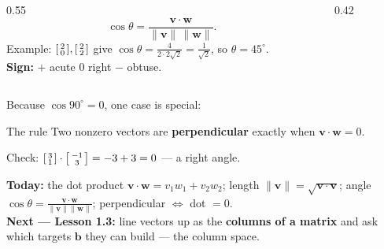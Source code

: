 \documentclass[aspectratio=169, 11pt]{beamer}
\newcommand{\vv}{\mathbf{v}}
\newcommand{\ww}{\mathbf{w}}
\begin{document}
\begin{frame}[t, plain]
  \begin{columns}[T]
    \begin{column}{0.55\textwidth}
      \[
        \cos\theta = \frac{\vv\cdot\ww}{\|\vv\|\,\|\ww\|}.
      \]
      Example: $\begin{bsmallmatrix} 2\\0 \end{bsmallmatrix},\begin{bsmallmatrix} 2\\2 \end{bsmallmatrix}$ give
      $\cos\theta=\tfrac{4}{2\cdot2\sqrt2}=\tfrac{1}{\sqrt2}$, so $\theta=45^\circ$.\\[6pt]
      \textbf{Sign:} $+$ acute \quad $0$ right \quad $-$ obtuse.
    \end{column}
    \begin{column}{0.42\textwidth}
      \centering
    \end{column}
  \end{columns}
\end{frame}

\begin{frame}[t, plain]
  Because $\cos 90^\circ = 0$, one case is special:
  \begin{block}{The rule}
    Two nonzero vectors are \textbf{perpendicular} exactly when $\vv\cdot\ww = 0$.
  \end{block}
  Check: $\begin{bsmallmatrix} 3\\1 \end{bsmallmatrix}\cdot\begin{bsmallmatrix} -1\\3 \end{bsmallmatrix}=-3+3=0$ --- a right angle.
\end{frame}

\begin{frame}[t, plain]
  \textbf{Today:} the dot product $\vv\cdot\ww=v_1w_1+v_2w_2$; length $\|\vv\|=\sqrt{\vv\cdot\vv}$;
  angle $\cos\theta=\tfrac{\vv\cdot\ww}{\|\vv\|\|\ww\|}$; perpendicular $\Leftrightarrow$ dot $=0$.\\[8pt]
  \textbf{Next --- Lesson 1.3:} line vectors up as the \textbf{columns of a matrix} and ask which
  targets $\mathbf{b}$ they can build --- the column space.
\end{frame}
\end{document}
